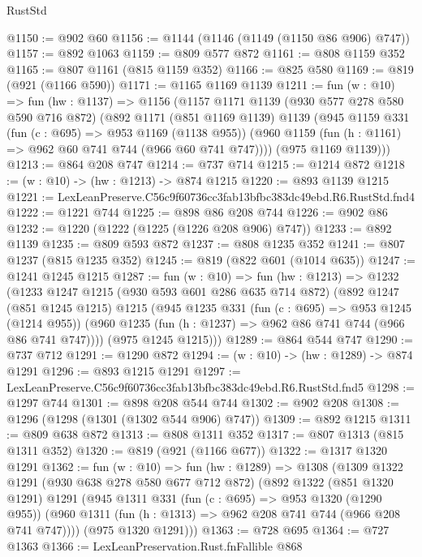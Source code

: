 \begin{lexlean}{RustStd}
\begin{coremodule}
@1150 := @902 @60
@1156 := @1144 (@1146 (@1149 (@1150 @86 @906) @747))
@1157 := @892 @1063
@1159 := @809 @577 @872
@1161 := @808 @1159 @352
@1165 := @807 @1161 (@815 @1159 @352)
@1166 := @825 @580
@1169 := @819 (@921 (@1166 @590))
@1171 := @1165 @1169 @1139
@1211 := fun (w : @10) =>
  fun (hw : @1137) =>
  @1156
    (@1157
      @1171
      @1139
      (@930 @577 @278 @580 @590 @716 @872)
      (@892
        @1171
        (@851 @1169 @1139)
        @1139
        (@945
          @1159
          @331
          (fun (c : @695) => @953 @1169 (@1138 @955))
          (@960 @1159 (fun (h : @1161) => @962 @60 @741 @744 (@966 @60 @741 @747))))
        (@975 @1169 @1139)))
@1213 := @864 @208 @747
@1214 := @737 @714
@1215 := @1214 @872
@1218 := (w : @10) -> (hw : @1213) -> @874 @1215
@1220 := @893 @1139 @1215
@1221 := LexLeanPreserve.C56c9f60736cc3fab13bfbc383dc49ebd.R6.RustStd.fnd4
@1222 := @1221 @744
@1225 := @898 @86 @208 @744
@1226 := @902 @86
@1232 := @1220 (@1222 (@1225 (@1226 @208 @906) @747))
@1233 := @892 @1139
@1235 := @809 @593 @872
@1237 := @808 @1235 @352
@1241 := @807 @1237 (@815 @1235 @352)
@1245 := @819 (@822 @601 (@1014 @635))
@1247 := @1241 @1245 @1215
@1287 := fun (w : @10) =>
  fun (hw : @1213) =>
  @1232
    (@1233
      @1247
      @1215
      (@930 @593 @601 @286 @635 @714 @872)
      (@892
        @1247
        (@851 @1245 @1215)
        @1215
        (@945
          @1235
          @331
          (fun (c : @695) => @953 @1245 (@1214 @955))
          (@960 @1235 (fun (h : @1237) => @962 @86 @741 @744 (@966 @86 @741 @747))))
        (@975 @1245 @1215)))
@1289 := @864 @544 @747
@1290 := @737 @712
@1291 := @1290 @872
@1294 := (w : @10) -> (hw : @1289) -> @874 @1291
@1296 := @893 @1215 @1291
@1297 := LexLeanPreserve.C56c9f60736cc3fab13bfbc383dc49ebd.R6.RustStd.fnd5
@1298 := @1297 @744
@1301 := @898 @208 @544 @744
@1302 := @902 @208
@1308 := @1296 (@1298 (@1301 (@1302 @544 @906) @747))
@1309 := @892 @1215
@1311 := @809 @638 @872
@1313 := @808 @1311 @352
@1317 := @807 @1313 (@815 @1311 @352)
@1320 := @819 (@921 (@1166 @677))
@1322 := @1317 @1320 @1291
@1362 := fun (w : @10) =>
  fun (hw : @1289) =>
  @1308
    (@1309
      @1322
      @1291
      (@930 @638 @278 @580 @677 @712 @872)
      (@892
        @1322
        (@851 @1320 @1291)
        @1291
        (@945
          @1311
          @331
          (fun (c : @695) => @953 @1320 (@1290 @955))
          (@960 @1311 (fun (h : @1313) => @962 @208 @741 @744 (@966 @208 @741 @747))))
        (@975 @1320 @1291)))
@1363 := @728 @695
@1364 := @727 @1363
@1366 := LexLeanPreservation.Rust.fnFallible @868

\end{coremodule}
\end{lexlean}
